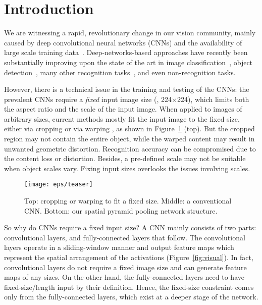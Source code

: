 \documentclass[10pt,journal,cspaper,compsoc]{IEEEtran}
\begin{document}
\maketitle

\section{Introduction}


We are witnessing a rapid, revolutionary change in our vision community, mainly caused by deep convolutional neural networks (CNNs) \cite{LeCun1989} and the availability of large scale training data~\cite{Deng2009}. Deep-networks-based approaches have recently been substantially improving upon the state of the art in image classification~\cite{Krizhevsky2012,Zeiler2013,Sermanet2013,Chatfield2014}, object detection~\cite{Girshick2014,Will2014,Sermanet2013}, many other recognition tasks~\cite{Razavian2014, Yaniv2014, Ning2014,Yunchao2014}, and even non-recognition tasks.

However, there is a technical issue in the training and testing of the CNNs: the prevalent CNNs require a \emph{fixed} input image size (\eg, 224$\times$224), which limits both the aspect ratio and the scale of the input image. When applied to images of arbitrary sizes, current methods mostly fit the input image to the fixed size, either via cropping \cite{Krizhevsky2012,Zeiler2013} or via warping \cite{Donahue2013,Girshick2014}, as shown in Figure~\ref{fig:teaser} (top). But the cropped region may not contain the entire object, while the warped content may result in unwanted geometric distortion. Recognition accuracy can be compromised due to the content loss or distortion. Besides, a pre-defined scale may not be suitable when object scales vary. Fixing input sizes overlooks the issues involving scales.

\begin{figure}[t]
\center
\texttt{[image: eps/teaser]}
\caption{Top: cropping or warping to fit a fixed size. Middle: a conventional CNN. Bottom: our spatial pyramid pooling network structure.}
\label{fig:teaser}
\end{figure}

So why do CNNs require a fixed input size?
A CNN mainly consists of two parts: convolutional layers, and fully-connected layers that follow. The convolutional layers operate in a sliding-window manner and output feature maps which represent the spatial arrangement of the activations (Figure~\ref{fig:visual}). In fact, convolutional layers do not require a fixed image size and can generate feature maps of any sizes. On the other hand, the fully-connected layers need to have fixed-size/length input by their definition. Hence, the fixed-size constraint comes only from the fully-connected layers, which exist at a deeper stage of the network.
\end{document}
